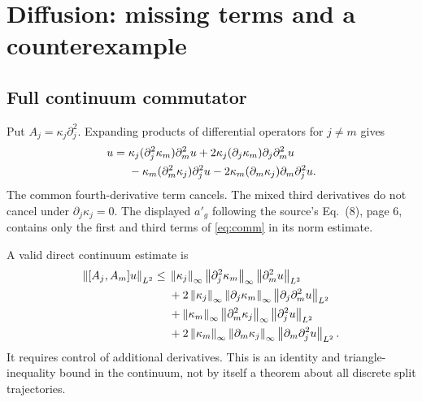 \documentclass[11pt]{article}
\newcommand{\norm}[1]{\left\lVert #1\right\rVert}
\begin{document}
\section{Diffusion: missing terms and a counterexample}
\subsection{Full continuum commutator}
Put $A_j=\kappa_j\partial_j^2$. Expanding products of differential operators
for $j\ne m$ gives
\begin{align}
[A_j,A_m]u={}&
 \kappa_j(\partial_j^2\kappa_m)\partial_m^2u
 +2\kappa_j(\partial_j\kappa_m)\partial_j\partial_m^2u \notag\\
 &-\kappa_m(\partial_m^2\kappa_j)\partial_j^2u
 -2\kappa_m(\partial_m\kappa_j)\partial_m\partial_j^2u .
 \label{eq:comm}
\end{align}
The common fourth-derivative term cancels. The mixed third derivatives
do not cancel under $\partial_j\kappa_j=0$.
The displayed $a'_g$ following the source's Eq.~(8), page 6, contains only
the first and third terms of \eqref{eq:comm} in its norm estimate.

A valid direct continuum estimate is
\begin{align}
\norm{[A_j,A_m]u}_{L^2}\leq{}&
 \norm{\kappa_j}_\infty\norm{\partial_j^2\kappa_m}_\infty
       \norm{\partial_m^2u}_{L^2}\notag\\
 &+2\norm{\kappa_j}_\infty\norm{\partial_j\kappa_m}_\infty
       \norm{\partial_j\partial_m^2u}_{L^2}\notag\\
 &+\norm{\kappa_m}_\infty\norm{\partial_m^2\kappa_j}_\infty
       \norm{\partial_j^2u}_{L^2}\notag\\
 &+2\norm{\kappa_m}_\infty\norm{\partial_m\kappa_j}_\infty
       \norm{\partial_m\partial_j^2u}_{L^2}.
 \label{eq:corrected-comm}
\end{align}
It requires control of additional derivatives. This is an identity and
triangle-inequality bound in the continuum, not by itself a theorem about
all discrete split trajectories.
\end{document}
